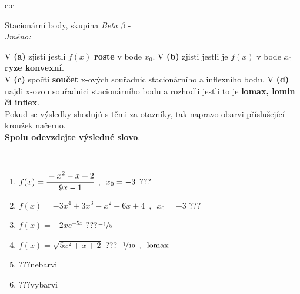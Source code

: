 \documentclass[10pt]{report}
\begin{document}
\newpage
\thispagestyle{empty}
\begin{tabular}{c:c}
\begin{minipage}[c][104.5mm][t]{0.5\linewidth}
\begin{center}
\vspace{7mm}
{\huge Stacionární body, skupina \textit{Beta $\beta$} -}\\[5mm]
\textit{Jméno:}\phantom{xxxxxxxxxxxxxxxxxxxxxxxxxxxxxxxxxxxxxxxxxxxxxxxxxxxxxxxxxxxxxxxxx}\\[5mm]
\begin{minipage}{0.95\linewidth}
\begin{center}
{\small V \textbf{(a)} zjisti jestli $f(x)$ \textbf{roste} v bode $x_0$. V \textbf{(b)} zjisti jestli je $f(x)$ v bode $x_0$ \textbf{ryze konvexní}.\\V \textbf{(c)} spočti \textbf{součet} x-ových souřadnic stacionárního a inflexního bodu. V \textbf{(d)} najdi x-ovou souřadnici stacionárního bodu a rozhodli jestli to je \textbf{lomax, lomin či inflex}.\\Pokud se výsledky shodujú s těmi za otazníky, tak napravo obarvi příslušející kroužek načerno.\\\textbf{Spolu odevzdejte výsledné slovo}}.
\end{center}
\end{minipage}
\\[1mm]
\begin{minipage}{0.79\linewidth}
\begin{center}
\begin{varwidth}{\linewidth}
\begin{enumerate}
\normalsize
\item $f(x)=\cfrac{-x^2-x+2}{9x-1}\enspace , \enspace x_0=-3$\quad \dotfill\; ???\;\dotfill \quad {}
\item $f(x)=-3x^4+3x^3-x^2-6x+4\enspace , \enspace x_0=-3$\quad \dotfill\; ???\;\dotfill \quad {}
\item $f(x)=-2xe^{-5x}$\quad \dotfill\; ???\;\dotfill \quad $\nicefrac{-1}{5}$
\item $f(x)=\sqrt{5x^2+x+2}$\quad \dotfill\; ???\;\dotfill \quad $\nicefrac{-1}{10}\enspace , \enspace\mathrm{lomax}$
\item \quad \dotfill\; ???\;\dotfill \quad nebarvi
\item \quad \dotfill\; ???\;\dotfill \quad vybarvi
\end{enumerate}
\end{varwidth}
\end{center}

\end{minipage}
\end{center}
\end{minipage}
\end{tabular}
\end{document}
